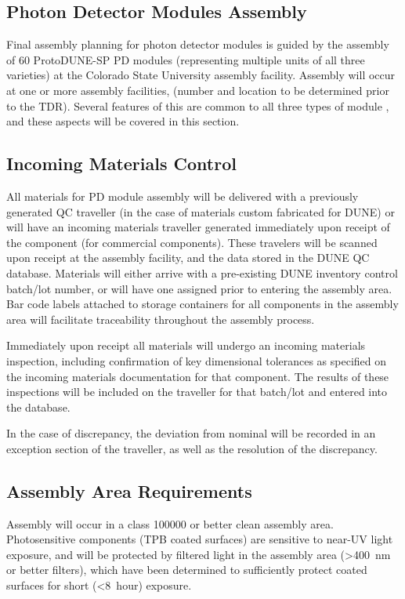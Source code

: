 \subsection{Photon Detector Modules Assembly}

Final assembly planning for photon detector modules is guided by the assembly of \num{60} ProtoDUNE-SP PD modules (representing multiple units of all three varieties) at the Colorado State University assembly facility.  Assembly will occur at one or more assembly facilities, (number and location to be determined prior to the TDR).  Several features of this are common to all three types of module , and these aspects will be covered in this section.

\subsection{Incoming Materials Control}

All materials for PD module assembly will be delivered with a previously generated QC traveller (in the case of materials custom fabricated for DUNE) or will have an incoming materials traveller generated immediately upon receipt of the component (for commercial components).  These travelers will be scanned upon receipt at the assembly facility, and the data stored in the DUNE QC database.  Materials will either arrive with a pre-existing DUNE inventory control batch/lot number, or will have one assigned prior to entering the assembly area.  Bar code labels attached to storage containers for all components in the assembly area will facilitate traceability throughout the assembly process.

Immediately upon receipt all materials will undergo an incoming materials inspection, including confirmation of key dimensional tolerances as specified on the incoming materials documentation for that component.  The results of these inspections will be included on the traveller for that batch/lot and entered into the database.

In the case of discrepancy, the deviation from nominal will be recorded in an exception section of the traveller, as well as the resolution of the discrepancy.

\subsection{Assembly Area Requirements}

Assembly will occur in a class \num{100000} or better clean assembly area.  Photosensitive components (TPB coated surfaces) are sensitive to near-UV light exposure, and will be protected by filtered light in the assembly area (>\SI{400}{nm} or better filters), which have been determined to sufficiently protect coated surfaces for short (<\SI{8}{hour}) exposure.

